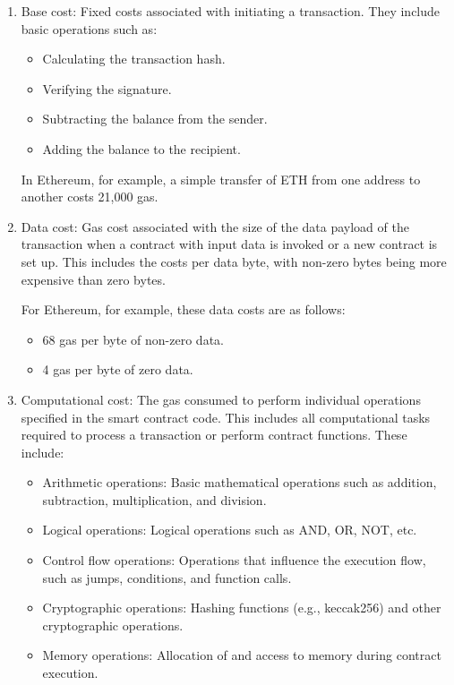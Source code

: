 \documentclass[runningheads]{llncs}
\begin{document}
\begin{enumerate}
\item Base cost: Fixed costs associated with initiating a transaction. They include basic operations such as:
\begin{itemize}
\item Calculating the transaction hash.
\item Verifying the signature.
\item Subtracting the balance from the sender.
\item Adding the balance to the recipient.
\end{itemize}
In Ethereum, for example, a simple transfer of ETH from one address to another costs 21,000 gas.
\item Data cost: Gas cost associated with the size of the data payload of the transaction when a contract with input data is invoked or a new contract is set up. This includes the costs per data byte, with non-zero bytes being more expensive than zero bytes.

 For Ethereum, for example, these data costs are as follows:
\begin{itemize}
    \item 68 gas per byte of non-zero data.
    \item 4 gas per byte of zero data.
\end{itemize}

\item Computational cost: The gas consumed to perform individual operations specified in the smart contract code. This includes all computational tasks required to process a transaction or perform contract functions. These include:
\begin{itemize}
    \item Arithmetic operations: Basic mathematical operations such as addition, subtraction, multiplication, and division.
    \item Logical operations: Logical operations such as AND, OR, NOT, etc.
    \item Control flow operations: Operations that influence the execution flow, such as jumps, conditions, and function calls.
    \item Cryptographic operations: Hashing functions (e.g., keccak256) and other cryptographic operations.
    \item Memory operations: Allocation of and access to memory during contract execution.
\end{itemize}


\end{enumerate}
\end{document}
